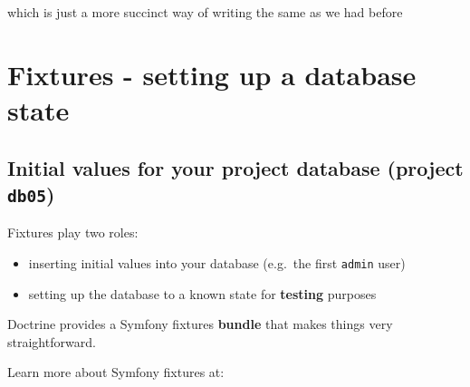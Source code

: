 \documentclass[a4paperpaper,openright]{book}
\newenvironment{Shaded}{}{}
\newcommand{\CommentTok}[1]{\textcolor[rgb]{0.38,0.63,0.69}{\textit{#1}}}
\newcommand{\KeywordTok}[1]{\textcolor[rgb]{0.00,0.44,0.13}{\textbf{#1}}}
\newcommand{\NormalTok}[1]{#1}
\newcommand{\OtherTok}[1]{\textcolor[rgb]{0.00,0.44,0.13}{#1}}
\newcommand{\StringTok}[1]{\textcolor[rgb]{0.25,0.44,0.63}{#1}}
\providecommand{\tightlist}{%
  \setlength{\itemsep}{0pt}\setlength{\parskip}{0pt}}
\begin{document}
which is just a more succinct way of writing the same as we had before

\begin{Shaded}
\end{Shaded}

\hypertarget{fixtures---setting-up-a-database-state}{%
\chapter{\texorpdfstring{Fixtures - setting up a database state
\label{chapter_fixtures}}{Fixtures - setting up a database state }}\label{fixtures---setting-up-a-database-state}}

\hypertarget{initial-values-for-your-project-database-project-db05}{%
\section{\texorpdfstring{Initial values for your project database
(project
\texttt{db05})}{Initial values for your project database (project db05)}}\label{initial-values-for-your-project-database-project-db05}}

Fixtures play two roles:

\begin{itemize}
\tightlist
\item
  inserting initial values into your database (e.g.~the first
  \texttt{admin} user)
\item
  setting up the database to a known state for \textbf{testing} purposes
\end{itemize}

Doctrine provides a Symfony fixtures \textbf{bundle} that makes things
very straightforward.

Learn more about Symfony fixtures at:
\end{document}
